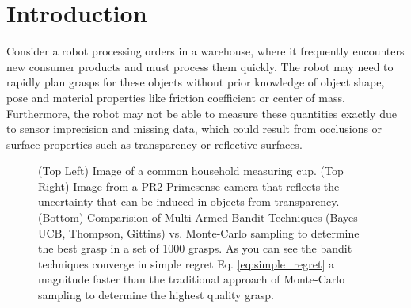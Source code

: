 \documentclass[journal,transmag]{IEEEtran}%
\begin{document}
\section{Introduction}



Consider a robot processing orders in a warehouse, where it frequently encounters new consumer products and must process them quickly.
The robot may need to rapidly plan grasps for these objects without prior knowledge of object shape, pose and material properties like friction coefficient or center of mass. 
Furthermore, the robot may not be able to measure these quantities exactly due to sensor imprecision and missing data, which could result from occlusions or surface properties such as transparency or reflective surfaces.

\begin{figure}%
    \centering
    
  
   
    \caption{(Top Left) Image of a common household measuring cup. (Top Right) Image from a PR2 Primesense camera that reflects the uncertainty that can be induced in objects from transparency. (Bottom) Comparision of Multi-Armed Bandit Techniques (Bayes UCB, Thompson, Gittins) vs. Monte-Carlo sampling to determine the best grasp in a set of 1000 grasps. As you can see the bandit techniques converge in simple regret Eq. \ref{eq:simple_regret} a magnitude faster than the traditional approach of Monte-Carlo sampling to determine the highest quality grasp.  }%
    \label{fig:rot_shapes}%
\end{figure}
\end{document}
